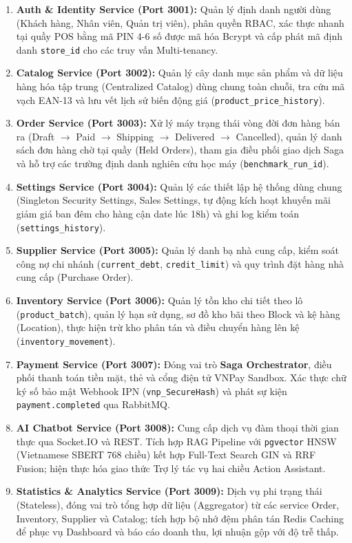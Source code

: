 \documentclass[12pt,a4paper]{report}
\begin{document}
\begin{enumerate}
    \item \textbf{Auth \& Identity Service (Port 3001):} Quản lý định danh người dùng (Khách hàng, Nhân viên, Quản trị viên), phân quyền RBAC, xác thực nhanh tại quầy POS bằng mã PIN 4-6 số được mã hóa Bcrypt và cấp phát mã định danh \texttt{store\_id} cho các truy vấn Multi-tenancy.
    \item \textbf{Catalog Service (Port 3002):} Quản lý cây danh mục sản phẩm và dữ liệu hàng hóa tập trung (Centralized Catalog) dùng chung toàn chuỗi, tra cứu mã vạch EAN-13 và lưu vết lịch sử biến động giá (\texttt{product\_price\_history}).
    \item \textbf{Order Service (Port 3003):} Xử lý máy trạng thái vòng đời đơn hàng bán ra (Draft $\rightarrow$ Paid $\rightarrow$ Shipping $\rightarrow$ Delivered $\rightarrow$ Cancelled), quản lý danh sách đơn hàng chờ tại quầy (Held Orders), tham gia điều phối giao dịch Saga và hỗ trợ các trường định danh nghiên cứu học máy (\texttt{benchmark\_run\_id}).
    \item \textbf{Settings Service (Port 3004):} Quản lý các thiết lập hệ thống dùng chung (Singleton Security Settings, Sales Settings, tự động kích hoạt khuyến mãi giảm giá ban đêm cho hàng cận date lúc 18h) và ghi log kiểm toán (\texttt{settings\_history}).
    \item \textbf{Supplier Service (Port 3005):} Quản lý danh bạ nhà cung cấp, kiểm soát công nợ chi nhánh (\texttt{current\_debt}, \texttt{credit\_limit}) và quy trình đặt hàng nhà cung cấp (Purchase Order).
    \item \textbf{Inventory Service (Port 3006):} Quản lý tồn kho chi tiết theo lô (\texttt{product\_batch}), quản lý hạn sử dụng, sơ đồ kho bãi theo Block và kệ hàng (Location), thực hiện trừ kho phân tán và điều chuyển hàng lên kệ (\texttt{inventory\_movement}).
    \item \textbf{Payment Service (Port 3007):} Đóng vai trò \textbf{Saga Orchestrator}, điều phối thanh toán tiền mặt, thẻ và cổng điện tử VNPay Sandbox. Xác thực chữ ký số bảo mật Webhook IPN (\texttt{vnp\_SecureHash}) và phát sự kiện \texttt{payment.completed} qua RabbitMQ.
    \item \textbf{AI Chatbot Service (Port 3008):} Cung cấp dịch vụ đàm thoại thời gian thực qua Socket.IO và REST. Tích hợp RAG Pipeline với \texttt{pgvector} HNSW (Vietnamese SBERT 768 chiều) kết hợp Full-Text Search GIN và RRF Fusion; hiện thực hóa giao thức Trợ lý tác vụ hai chiều Action Assistant.
    \item \textbf{Statistics \& Analytics Service (Port 3009):} Dịch vụ phi trạng thái (Stateless), đóng vai trò tổng hợp dữ liệu (Aggregator) từ các service Order, Inventory, Supplier và Catalog; tích hợp bộ nhớ đệm phân tán Redis Caching để phục vụ Dashboard và báo cáo doanh thu, lợi nhuận gộp với độ trễ thấp.
\end{enumerate}
\end{document}
